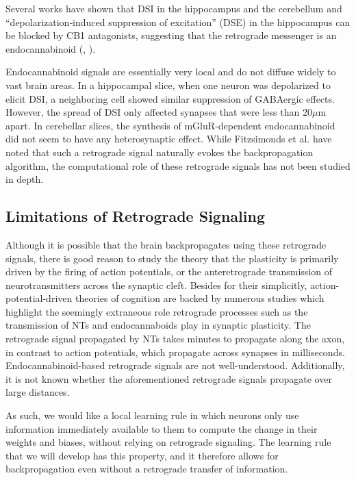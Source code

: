 \documentclass[12pt]{article}
\begin{document}
Several works have shown that DSI in the hippocampus and the cerebellum and ``depolarization‐induced suppression of excitation'' (DSE) in the hippocampus can be blocked by CB1 antagonists, suggesting that the retrograde messenger is an endocannabinoid (\cite{Kreitzer2001}, \cite{OhnoShosaku2001}).

Endocannabinoid signals are essentially very local and do not diffuse widely to vast brain areas. \cite{Wilson2001} In a hippocampal slice, when one neuron was depolarized to elicit DSI, a neighboring cell showed similar suppression of GABAergic effects. However, the spread of DSI only affected synapses that were less than 20$\mu$m apart. In cerebellar slices, the synthesis of mGluR‐dependent endocannabinoid did not seem to have any heterosynaptic effect. While Fitzsimonds et al. \cite{Fitzsimons1997} have noted that such a retrograde signal naturally evokes the backpropagation algorithm, the computational role of these retrograde signals has not been studied in depth.

\subsection{Limitations of Retrograde Signaling}
Although it is possible that the brain backpropagates using these retrograde signals, there is good reason to study the theory that the plasticity is primarily driven by the firing of action potentials, or the anteretrograde transmission of neurotransmitters across the synaptic cleft. Besides for their simplicitly, action-potential-driven theories of cognition are backed by numerous studies which highlight the seemingly extraneous role retrograde processes such as the transmission of NTs and endocannaboids play in synaptic plasticity. The retrograde signal propagated by NTs takes minutes to propagate along the axon, \cite{Poo2001} in contrast to action potentials, which propagate across synapses in milliseconds. Endocannabinoid-based retrograde signals are not well-understood. \cite{OhnoShosaku2014} Additionally, it is not known whether the aforementioned retrograde signals propagate over large distances. \cite{Matusica2014}

As such, we would like a local learning rule in which neurons only use information immediately available to them to compute the change in their weights and biases, without relying on retrograde signaling. The learning rule that we will develop has this property, and it therefore allows for backpropagation even without a retrograde transfer of information.
\end{document}
